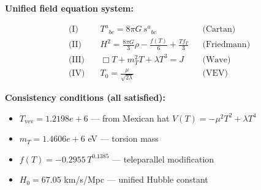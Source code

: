 
\textbf{Unified field equation system:}

\begin{align}
  \text{(I)} \quad & T^a{}_{bc} = 8\pi G \, s^a{}_{bc} && \text{(Cartan)} \\
  \text{(II)} \quad & H^2 = \frac{8\pi G}{3}\rho - \frac{f(T)}{6} + \frac{Tf_T}{3} && \text{(Friedmann)} \\
  \text{(III)} \quad & \Box T + m_T^2 T + \lambda T^3 = J && \text{(Wave)} \\
  \text{(IV)} \quad & T_0 = \frac{\mu}{\sqrt{2\lambda}} && \text{(VEV)}
\end{align}

\textbf{Consistency conditions (all satisfied):}
\begin{itemize}
  \item $T_{\text{vev}} = 1.2198e+6$ — from Mexican hat $V(T) = -\mu^2 T^2 + \lambda T^4$
  \item $m_T = 1.4606e+6$ eV — torsion mass
  \item $f(T) = -0.2955 \, T^{0.1385}$ — teleparallel modification
  \item $H_0 = 67.05$ km/s/Mpc — unified Hubble constant
\end{itemize}